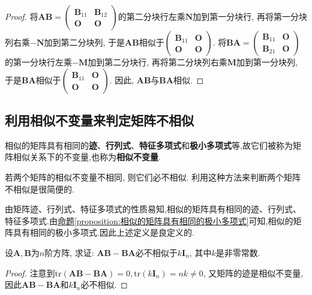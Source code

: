 \documentclass[../../main.tex]{subfiles}
\begin{document}
\begin{proof}
将\(\boldsymbol{AB}=\begin{pmatrix}\boldsymbol{B}_{11}&\boldsymbol{B}_{12}\\\boldsymbol{O}&\boldsymbol{O}\end{pmatrix}\)的第二分块行左乘\(\boldsymbol{N}\)加到第一分块行, 再将第一分块列右乘\(-\boldsymbol{N}\)加到第二分块列, 于是\(\boldsymbol{AB}\)相似于\(\begin{pmatrix}\boldsymbol{B}_{11}&\boldsymbol{O}\\\boldsymbol{O}&\boldsymbol{O}\end{pmatrix}\). 将\(\boldsymbol{BA}=\begin{pmatrix}\boldsymbol{B}_{11}&\boldsymbol{O}\\\boldsymbol{B}_{21}&\boldsymbol{O}\end{pmatrix}\)的第一分块行左乘\(-\boldsymbol{M}\)加到第二分块行, 再将第二分块列右乘\(\boldsymbol{M}\)加到第一分块列, 于是\(\boldsymbol{BA}\)相似于\(\begin{pmatrix}\boldsymbol{B}_{11}&\boldsymbol{O}\\\boldsymbol{O}&\boldsymbol{O}\end{pmatrix}\). 因此, \(\boldsymbol{AB}\)与\(\boldsymbol{BA}\)相似.

\end{proof}

\subsection{利用相似不变量来判定矩阵不相似}

\begin{definition}[相似不变量]
相似的矩阵具有相同的\textbf{迹}、\textbf{行列式}、\textbf{特征多项式}和\textbf{极小多项式}等,故它们被称为矩阵相似关系下的不变量,也称为\textbf{相似不变量}. 
\end{definition}
\begin{remark}
若两个矩阵的相似不变量不相同, 则它们必不相似. 利用这种方法来判断两个矩阵不相似是很简便的. 
\end{remark}
\begin{note}
由矩阵迹、行列式、特征多项式的性质易知,相似的矩阵具有相同的迹、行列式、特征多项式.由\hyperref[proposition:相似的矩阵具有相同的极小多项式]{命题\ref{proposition:相似的矩阵具有相同的极小多项式}}可知,相似的矩阵具有相同的极小多项式.因此上述定义是良定义的.
\end{note}

\begin{example}
设\(\boldsymbol{A},\boldsymbol{B}\)为\(n\)阶方阵, 求证: \(\boldsymbol{AB}-\boldsymbol{BA}\)必不相似于\(k\boldsymbol{I}_{n}\), 其中\(k\)是非零常数.
\end{example}
\begin{proof}
注意到\(\mathrm{tr}(\boldsymbol{AB}-\boldsymbol{BA}) = 0,\mathrm{tr}(k\boldsymbol{I}_{n}) = nk\neq 0\), 又矩阵的迹是相似不变量, 因此\(\boldsymbol{AB}-\boldsymbol{BA}\)和\(k\boldsymbol{I}_{n}\)必不相似.

\end{proof}
\end{document}
